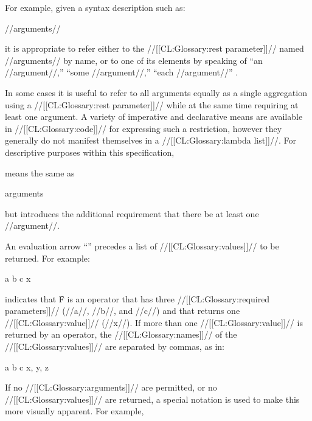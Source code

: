 For example, given a syntax description such as:

 {{\rest} //arguments//}

\noindent it is appropriate to refer either to the //[[CL:Glossary:rest parameter]]// named //arguments// by name, or to one of its elements by speaking of ``an //argument//,'' ``some //argument//,'' ``each //argument//'' \etc.

\endsubsubsubsection%


In some cases it is useful to refer to all arguments equally as a single aggregation using a //[[CL:Glossary:rest parameter]]// while at the same time requiring at least one argument.  A variety of imperative and declarative means are available in //[[CL:Glossary:code]]// for expressing such a restriction, however they generally do not manifest themselves in a //[[CL:Glossary:lambda list]]//.  For descriptive purposes within this specification,

 {{\rest} }

\noindent means the same as

 {{\rest} arguments}

\noindent but introduces the additional requirement that there be  at least one //argument//.

\endsubsubsubsection%


An evaluation arrow ``{\EV}'' precedes a list of //[[CL:Glossary:values]]// to be returned. For example:

 {a b c} {x}

\noindent indicates that \f{F} is an operator that has three //[[CL:Glossary:required parameters]]// (\ie //a//, //b//, and //c//) and that returns one //[[CL:Glossary:value]]// (\ie //x//). If more than one //[[CL:Glossary:value]]// is returned by an operator, the //[[CL:Glossary:names]]// of the //[[CL:Glossary:values]]// are separated by commas, as in:

 {a b c} {x, y, z}


If no //[[CL:Glossary:arguments]]// are permitted, or no //[[CL:Glossary:values]]// are returned,  a special notation is used to make this more visually apparent.  For example,

